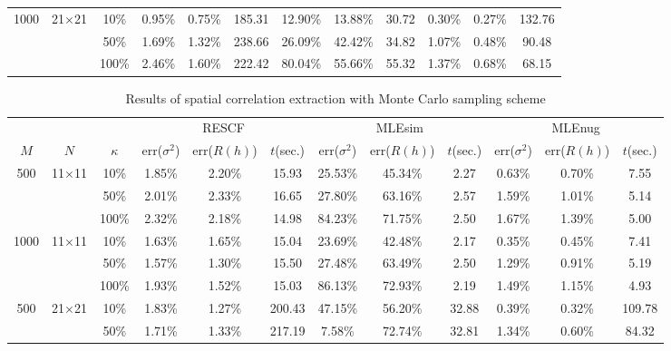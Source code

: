 \documentclass[referee]{ieice}
\begin{document}
\begin{table*}[tb]
{\begin{center}
\begin{tabular}{|c|c|c|c|c|c|c|c|c|c|c|c|}
        1000 & 21$\times$21 & 10\% & 0.95\% & 0.75\% & 185.31 & 12.90\% & 13.88\% & 30.72 & 0.30\% & 0.27\% & 132.76 \\ \cline{3-12}
              & & 50\% & 1.69\% & 1.32\% & 238.66 & 26.09\% & 42.42\% & 34.82 & 1.07\% & 0.48\% & 90.48 \\ \cline{3-12}
              & & 100\% & 2.46\% & 1.60\% & 222.42 & 80.04\% & 55.66\% & 55.32 & 1.37\% & 0.68\% & 68.15 \\ \cline{3-12} \hline
      \end{tabular}
    \end{center}
}
\end{table*}

\begin{table*}[tb]
  \caption{Results of spatial correlation extraction with Monte Carlo sampling scheme}  \label{tab:1_MC}
{\small
    \begin{center}
      \begin{tabular}{|c|c|c|c|c|c|c|c|c|c|c|c|} \hline
               & & & \multicolumn{3}{|c|}{RESCF} & \multicolumn{3}{|c|}{MLEsim} & \multicolumn{3}{|c|}{MLEnug} \\ \cline{4-12}
         $M$  & $N$ & $\kappa$ & err($\sigma^2$) & err($R(h)$) & $t$(sec.) & err($\sigma^2$) & err($R(h)$) & $t$(sec.) & err($\sigma^2$) & err($R(h)$) & $t$(sec.) \\ \hline
        500 & 11$\times$11 & 10\% & 1.85\% & 2.20\% & 15.93 & 25.53\% & 45.34\% & 2.27 & 0.63\% & 0.70\% & 7.55 \\ \cline{3-12}
              & & 50\% & 2.01\% & 2.33\% & 16.65 & 27.80\% & 63.16\% & 2.57 & 1.59\% & 1.01\% & 5.14 \\ \cline{3-12}
              & & 100\% & 2.32\% & 2.18\% & 14.98 & 84.23\% & 71.75\% & 2.50 & 1.67\% & 1.39\% & 5.00 \\ \cline{3-12} \hline
        1000 & 11$\times$11 & 10\% & 1.63\% & 1.65\% & 15.04 & 23.69\% & 42.48\% & 2.17 & 0.35\% & 0.45\% & 7.41 \\ \cline{3-12}
              & & 50\% & 1.57\% & 1.30\% & 15.50 & 27.48\% & 63.49\% & 2.50 & 1.29\% & 0.91\% & 5.19 \\ \cline{3-12}
              & & 100\% & 1.93\% & 1.52\% & 15.03 & 86.13\% & 72.93\% & 2.19 & 1.49\% & 1.15\% & 4.93 \\ \cline{3-12} \hline
        500 & 21$\times$21 & 10\% & 1.83\% & 1.27\% & 200.43 & 47.15\% & 56.20\% & 32.88 & 0.39\% & 0.32\% & 109.78 \\ \cline{3-12}
              & & 50\% & 1.71\% & 1.33\% & 217.19 & 7.58\% & 72.74\% & 32.81 & 1.34\% & 0.60\% & 84.32 \\ \cline{3-12}

\end{tabular}
\end{center}}
\end{table*}
\end{document}
